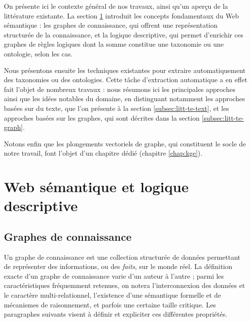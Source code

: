 \label{chap:revue}


On présente ici le contexte général de nos travaux, ainsi qu'un aperçu de la littérature existante.
La section \ref{sec:dl} introduit les concepts fondamentaux du Web sémantique : les graphes de connaissance, qui offrent une représentation structurée de la connaissance, et la logique descriptive, qui permet d'enrichir ces graphes de règles logiques dont la somme constitue une taxonomie ou une ontologie, selon les cas.

Nous présentons ensuite les techniques existantes pour extraire automatiquement des taxonomies ou des ontologies. Cette tâche d'extraction automatique a en effet fait l'objet de nombreux travaux : nous résumons ici les principales approches ainsi que les idées notables du domaine, en distinguant notamment les approches basées sur du texte, que l'on présente à la section \ref{subsec:litt-te-text}, et les approches basées sur les graphes, qui sont décrites dans la section \ref{subsec:litt-te-graph}.

Notons enfin que les plongements vectoriels de graphe, qui constituent le socle de notre travail, font l'objet d'un chapitre dédié (chapitre \ref{chap:kge}).


\section{Web sémantique et logique descriptive}
\label{sec:dl}

\subsection{Graphes de connaissance}





Un graphe de connaissance est une collection structurée de données permettant de représenter des informations, ou des \textit{faits}, sur le monde réel. La définition exacte d'un graphe de connaissance varie d'un auteur à l'autre \cite{ehrlinger2016towards}; parmi les caractéristiques fréquemment retenues, on notera l'interconnexion des données et le caractère multi-relationnel, l'existence d'une sémantique formelle et de mécanismes de raisonnement, et parfois une certaine taille critique. Les paragraphes suivants visent à définir et expliciter ces différentes propriétés.


